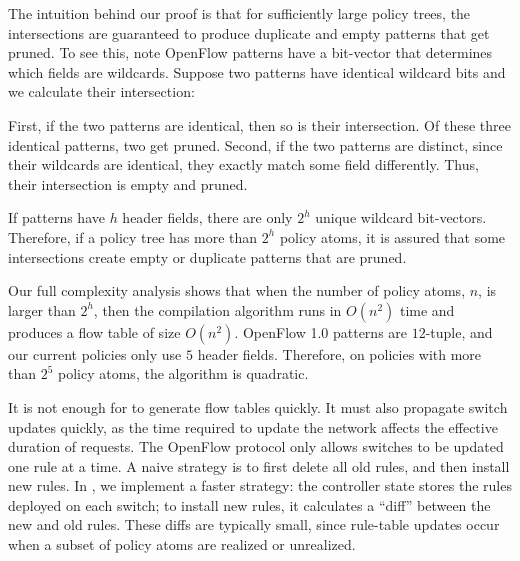 The intuition behind our proof is that for sufficiently large policy trees,
the intersections are guaranteed to produce
duplicate and empty patterns that get pruned. To see this,
note OpenFlow patterns have a bit-vector that determines which fields
are wildcards.  Suppose two patterns have identical wildcard bits and
we calculate their intersection:

First, if the two patterns are identical, then so is their
  intersection. Of these three identical patterns, two get pruned.
Second, if the two patterns are distinct, since their wildcards are
  identical, they exactly match some field differently. Thus, their
  intersection is empty and pruned.

If patterns have $h$ header fields, there are only $2^h$ unique
wildcard bit-vectors. Therefore, if a policy tree has more than $2^h$
policy atoms, it is assured that some intersections create empty or duplicate
patterns that are pruned.

Our full complexity analysis shows that when the
number of policy atoms, $n$, is larger than $2^h$, then the
compilation algorithm runs in $O(n^2)$ time and produces a flow table
of size $O(n^2)$. OpenFlow 1.0 patterns are $12$-tuple, and our current
policies
only use $5$ header fields. Therefore, on policies
with more than $2^5$ policy atoms, the algorithm is quadratic.


It is not enough for \sys to generate flow tables quickly. It must
also propagate switch updates quickly, as the time required to update
the network affects the effective duration of requests.
The OpenFlow protocol only allows switches to be updated one rule at a
time.  A naive strategy is to first delete all old rules, and then
install new rules. In \sys, we implement a faster strategy: the
controller state stores the rules deployed on each switch; to install
new rules, it calculates a ``diff'' between the new and old
rules. These diffs are typically small, since rule-table updates occur
when a subset of policy atoms are realized or unrealized.



